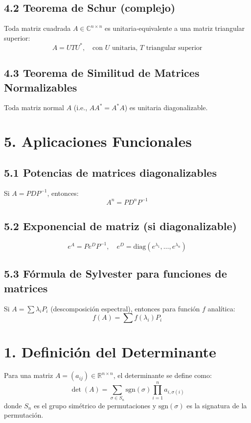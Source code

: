 \documentclass{article}
\begin{document}
\subsection*{4.2 Teorema de Schur (complejo)}
Toda matriz cuadrada \(A \in \mathbb{C}^{n \times n}\) es unitaria-equivalente a una matriz triangular superior:
\[
A = U T U^*, \quad \text{con } U \text{ unitaria, } T \text{ triangular superior}
\]

\subsection*{4.3 Teorema de Similitud de Matrices Normalizables}
Toda matriz normal \(A\) (i.e., \(AA^* = A^*A\)) es unitaria diagonalizable.

\section*{5. Aplicaciones Funcionales}

\subsection*{5.1 Potencias de matrices diagonalizables}
Si \(A = PDP^{-1}\), entonces:
\[
A^n = P D^n P^{-1}
\]

\subsection*{5.2 Exponencial de matriz (si diagonalizable)}
\[
e^A = P e^D P^{-1}, \quad e^D = \text{diag}(e^{\lambda_1}, \dots, e^{\lambda_n})
\]

\subsection*{5.3 Fórmula de Sylvester para funciones de matrices}
Si \(A = \sum \lambda_i P_i\) (descomposición espectral), entonces para función \(f\) analítica:
\[
f(A) = \sum f(\lambda_i) P_i
\]








\newpage

\section*{1. Definición del Determinante}

Para una matriz \( A = (a_{ij}) \in \mathbb{R}^{n \times n} \), el determinante se define como:
\[
\det(A) = \sum_{\sigma \in S_n} \text{sgn}(\sigma) \prod_{i=1}^n a_{i,\sigma(i)}
\]
donde \( S_n \) es el grupo simétrico de permutaciones y \(\text{sgn}(\sigma)\) es la signatura de la permutación.
\end{document}
